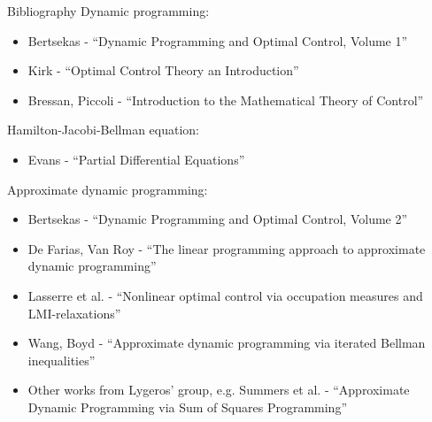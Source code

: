 \documentclass[aspectratio=169]{beamer}
\begin{document}
\begin{frame}{Bibliography}
\footnotesize
Dynamic programming:
\begin{itemize}
\item
Bertsekas - ``Dynamic Programming and Optimal Control, Volume 1''
\item
Kirk - ``Optimal Control Theory an Introduction''
\item
Bressan, Piccoli - ``Introduction to the Mathematical Theory of Control''
\end{itemize}
Hamilton-Jacobi-Bellman equation:
\begin{itemize}
\item
Evans - ``Partial Differential Equations''
\end{itemize}
Approximate dynamic programming:
\begin{itemize}
\item
Bertsekas - ``Dynamic Programming and Optimal Control, Volume 2''
\item
De Farias, Van Roy - ``The linear programming approach to approximate dynamic programming''
\item
Lasserre et al. - ``Nonlinear optimal control via occupation measures and LMI-relaxations''
\item
Wang, Boyd - ``Approximate dynamic programming via iterated Bellman inequalities''
\item
Other works from Lygeros' group, e.g. Summers et al. - ``Approximate Dynamic Programming via Sum of Squares Programming''
\end{itemize}
\end{frame}
\end{document}
